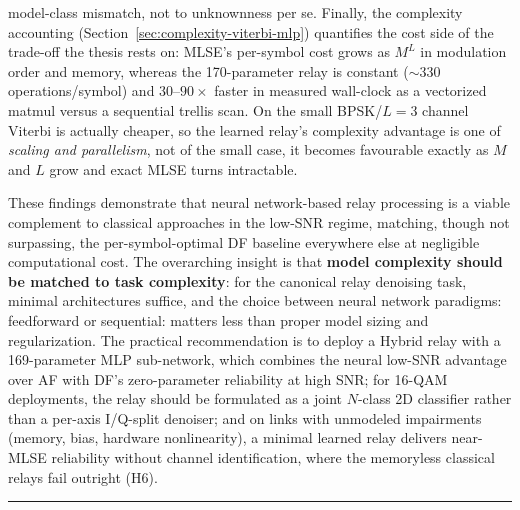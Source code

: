 \begin{itemize}
model-class mismatch, not to unknownness per se. Finally, the complexity accounting (Section~\ref{sec:complexity-viterbi-mlp}) quantifies the cost side of the trade-off the thesis rests on: MLSE's per-symbol cost grows as $M^{L}$ in modulation order and memory, whereas the 170-parameter relay is constant ($\sim$330 operations/symbol) and $30$--$90\times$ faster in measured wall-clock as a vectorized matmul versus a sequential trellis scan. On the small BPSK/$L{=}3$ channel Viterbi is actually cheaper, so the learned relay's complexity advantage is one of \emph{scaling and parallelism}, not of the small case, it becomes favourable exactly as $M$ and $L$ grow and exact MLSE turns intractable.
\end{itemize}

These findings demonstrate that neural network-based relay processing is a viable complement to classical approaches in the low-SNR regime, matching, though not surpassing, the per-symbol-optimal DF baseline everywhere else at negligible computational cost. The overarching insight is that \textbf{model complexity should be matched to task complexity}: for the canonical relay denoising task, minimal architectures suffice, and the choice between neural network paradigms: feedforward or sequential: matters less than proper model sizing and regularization. The practical recommendation is to deploy a Hybrid relay with a 169-parameter MLP sub-network, which combines the neural low-SNR advantage over AF with DF's zero-parameter reliability at high SNR; for 16-QAM deployments, the relay should be formulated as a joint $N$-class 2D classifier rather than a per-axis I/Q-split denoiser; and on links with unmodeled impairments (memory, bias, hardware nonlinearity), a minimal learned relay delivers near-MLSE reliability without channel identification, where the memoryless classical relays fail outright (H6).

\begin{center}\rule{0.5\linewidth}{0.5pt}\end{center}


